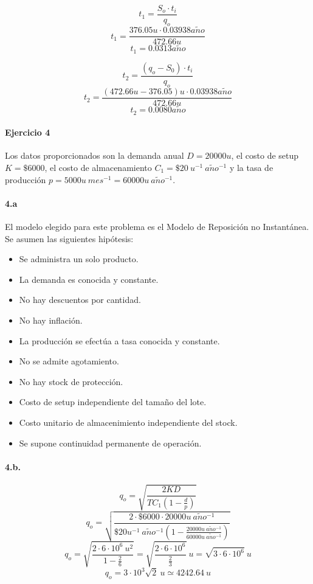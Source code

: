 \documentclass[a4paper,10pt]{article}
\def \anio {a\tilde{n}o}
\begin{document}
  $$t_1 = \frac{S_o \cdot t_i}{q_o} $$
  $$t_1 = \frac{376.05 u \cdot 0.03938 \anio}{472.66 u} $$
  $$\boxed{t_1 = 0.0313 \anio}$$

  $$t_2 = \frac{(q_o - S_0) \cdot t_i}{q_o} $$
  $$t_2 = \frac{(472.66 u - 376.05) u \cdot 0.03938 \anio}{472.66 u} $$
  $$\boxed{t_2 = 0.0080 \anio} $$
  
 
\paragraph{Ejercicio 4}
    Los datos proporcionados son la demanda anual $ D = 20000 u $, el costo de setup $ K = \$6000 $, el costo de almacenamiento $ C_1 = \$20\ u^{-1}\ \anio^{-1} $ y la tasa de producción $ p = 5000u\ mes^{-1} = 60000u\ \anio^{-1}$.

    \paragraph{4.a}
    El modelo elegido para este problema es el Modelo de Reposición no Instantánea. Se asumen las siguientes hipótesis:
        \begin{itemize}
            \item Se administra un solo producto.
            \item La demanda es conocida y constante.
            \item No hay descuentos por cantidad.
            \item No hay inflación.
            \item La producción se efectúa a tasa conocida y constante.
            \item No se admite agotamiento.
            \item No hay stock de protección.
            \item Costo de setup independiente del tamaño del lote.
            \item Costo unitario de almacenimiento independiente del stock.
            \item Se supone continuidad permanente de operación.
        \end{itemize}

    \paragraph{4.b.} 
        $$ q_o = \sqrt{ \frac{2KD}{TC_1 \left( 1 - \frac{d}{p} \right)} } $$
        $$ q_o = \sqrt{ \frac{2 \cdot \$ 6000 \cdot 20000u\ \anio^{-1}}{\$20 u^{-1}\ \anio^{-1} \left( 1 - \frac{20000u\ \anio^{-1}}{60000u\ \anio^{-1}} \right)} } $$
        $$ q_o = \sqrt{ \frac{2 \cdot 6 \cdot 10^6\ u^2}{1 - \frac{2}{6}} } = \sqrt{ \frac{2 \cdot 6 \cdot 10^6}{\frac{2}{3}} }\ u = \sqrt{ 3 \cdot 6 \cdot 10^6 }\ u $$
        $$ \boxed{ q_o = 3 \cdot 10^3 \sqrt {2}\ u \simeq 4242.64\ u } $$
\end{document}
